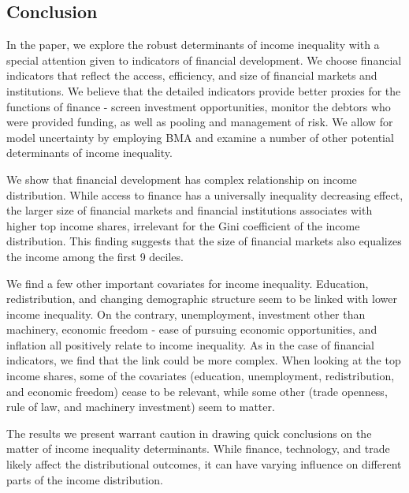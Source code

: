 \begin{refsection}
%
%
%
%
%

\section{Conclusion}
\label{ch4sec:conclusion}
In the paper, we explore the robust determinants of income inequality with a special attention given to indicators of financial development. We choose financial indicators that reflect the access, efficiency, and size of financial markets and institutions. We believe that the detailed indicators provide better proxies for the functions of finance - screen investment opportunities, monitor the debtors who were provided funding, as well as pooling and management of risk. We allow for model uncertainty by employing \ac{BMA} and examine a number of other potential determinants of income inequality. 

We show that financial development has complex relationship on income distribution. While access to finance has a universally inequality decreasing effect, the larger size of financial markets and financial institutions associates with higher top income shares, irrelevant for the Gini coefficient of the income distribution. This finding suggests that the size of financial markets also equalizes the income among the first 9 deciles. 

We find a few other important covariates for income inequality. Education, redistribution, and changing demographic structure seem to be linked with lower income inequality. On the contrary, unemployment, investment other than machinery, economic freedom - ease of pursuing economic opportunities, and inflation all positively relate to income inequality. As in the case of financial indicators, we find that the link could be more complex. When looking at the top income shares, some of the covariates (education, unemployment, redistribution, and economic freedom) cease to be relevant, while some other (trade openness, rule of law, and machinery investment) seem to matter.

The results we present warrant caution in drawing quick conclusions on the matter of income inequality determinants. While finance, technology, and trade likely affect the distributional outcomes, it can have varying influence on different parts of the income distribution.



\end{refsection}
